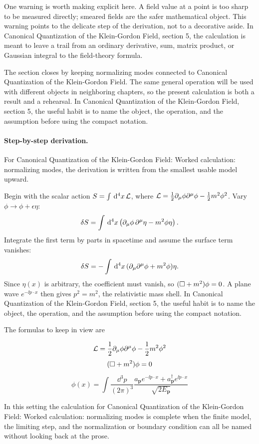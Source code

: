 One warning is worth making explicit here.  A field value at a point is too sharp to be measured directly; smeared fields are the safer mathematical object.  This warning points to the delicate step of the derivation, not to a decorative aside.  In Canonical Quantization of the Klein-Gordon Field, section 5, the calculation is meant to leave a trail from an ordinary derivative, sum, matrix product, or Gaussian integral to the field-theory formula.

The section closes by keeping normalizing modes connected to Canonical Quantization of the Klein-Gordon Field.  The same general operation will be used with different objects in neighboring chapters, so the present calculation is both a result and a rehearsal.  In Canonical Quantization of the Klein-Gordon Field, section 5, the useful habit is to name the object, the operation, and the assumption before using the compact notation.



\paragraph{Step-by-step derivation.}

For Canonical Quantization of the Klein-Gordon Field: Worked calculation: normalizing modes, the derivation is written from the smallest usable model upward.

Begin with the scalar action \(S=\int\,\mathrm d^4x\,\mathcal L\), where \(\mathcal L=\frac12\partial_\mu\phi\partial^\mu\phi-\frac12m^2\phi^2\).  Vary \(\phi\to\phi+\epsilon\eta\):
\[
  \delta S=\int\,\mathrm d^4x\left(\partial_\mu\phi\,\partial^\mu\eta-m^2\phi\eta\right).
\]
Integrate the first term by parts in spacetime and assume the surface term vanishes:
\[
  \delta S=-\int\,\mathrm d^4x\,(\partial_\mu\partial^\mu\phi+m^2\phi)\eta.
\]
Since \(\eta(x)\) is arbitrary, the coefficient must vanish, so \((\Box+m^2)\phi=0\).  A plane wave \(e^{-\ii p\cdot x}\) then gives \(p^2=m^2\), the relativistic mass shell.  In Canonical Quantization of the Klein-Gordon Field, section 5, the useful habit is to name the object, the operation, and the assumption before using the compact notation.

The formulas to keep in view are

\[
  \mathcal L=\frac12\partial_\mu\phi\partial^\mu\phi-\frac12m^2\phi^2
\]
\[
  (\Box+m^2)\phi=0
\]
\[
  \phi(x)=\int\frac{\dd^3p}{(2\pi)^3}\frac{a_{\bm p}e^{-\ii p\cdot x}+a_{\bm p}^\dagger e^{\ii p\cdot x}}{\sqrt{2E_{\bm p}}}
\]

In this setting the calculation for Canonical Quantization of the Klein-Gordon Field: Worked calculation: normalizing modes is complete when the finite model, the limiting step, and the normalization or boundary condition can all be named without looking back at the prose.




